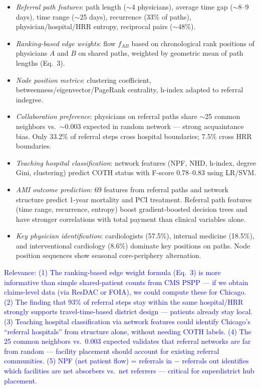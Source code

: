 \documentclass[11pt]{article}
\begin{document}
\begin{enumerate}
\begin{itemize}
    \item \textit{Referral path features}: path length ($\sim$4 physicians), average time gap ($\sim$8--9 days), time range ($\sim$25 days), recurrence (33\% of paths), physician/hospital/HRR entropy, reciprocal pairs ($\sim$48\%).
    \item \textit{Ranking-based edge weights}: flow $f_{AB}$ based on chronological rank positions of physicians $A$ and $B$ on shared paths, weighted by geometric mean of path lengths (Eq.~3).
    \item \textit{Node position metrics}: clustering coefficient, betweenness/eigenvector/PageRank centrality, h-index adapted to referral indegree.
    \item \textit{Collaboration preference}: physicians on referral paths share $\sim$25 common neighbors vs.\ $\sim$0.003 expected in random network --- strong acquaintance bias. Only 33.2\% of referral steps cross hospital boundaries; 7.5\% cross HRR boundaries.
    \item \textit{Teaching hospital classification}: network features (NPF, NHD, h-index, degree Gini, clustering) predict COTH status with F-score 0.78--0.83 using LR/SVM.
    \item \textit{AMI outcome prediction}: 69 features from referral paths and network structure predict 1-year mortality and PCI treatment. Referral path features (time range, recurrence, entropy) boost gradient-boosted decision trees and have stronger correlations with total payment than clinical variables alone.
    \item \textit{Key physician identification}: cardiologists (57.5\%), internal medicine (18.5\%), and interventional cardiology (8.6\%) dominate key positions on paths. Node position sequences show seasonal core-periphery alternation.
\end{itemize}

\textcolor{blue}{Relevance: (1) The ranking-based edge weight formula (Eq.~3) is more informative than simple shared-patient counts from CMS PSPP --- if we obtain claims-level data (via ResDAC or FOIA), we could compute these for Chicago. (2) The finding that 93\% of referral steps stay within the same hospital/HRR strongly supports travel-time-based district design --- patients already stay local. (3) Teaching hospital classification via network features could identify Chicago's ``referral hospitals'' from structure alone, without needing COTH labels. (4) The 25 common neighbors vs.\ 0.003 expected validates that referral networks are far from random --- facility placement should account for existing referral communities. (5) NPF (net patient flow) = referrals in $-$ referrals out identifies which facilities are net absorbers vs.\ net referrers --- critical for superdistrict hub placement.}


\end{enumerate}
\end{document}
